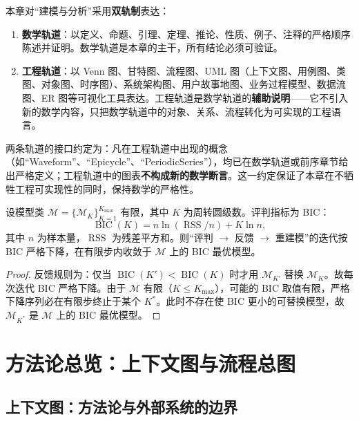 \begin{remark}[本章的建模双轨制]\label{rem:modelling_dual_track}
本章对“建模与分析”采用\textbf{双轨制}表达：
\begin{enumerate}[label=(\roman*)]
    \item \textbf{数学轨道}：以定义、命题、引理、定理、推论、性质、例子、注释的严格顺序陈述并证明。数学轨道是本章的主干，所有结论必须可验证。
    \item \textbf{工程轨道}：以 Venn 图、甘特图、流程图、UML 图（上下文图、用例图、类图、对象图、时序图）、系统架构图、用户故事地图、业务过程模型、数据流图、ER 图等可视化工具表达。工程轨道是数学轨道的\textbf{辅助说明}——它不引入新的数学内容，只把数学轨道中的对象、关系、流程转化为可实现的工程语言。
\end{enumerate}
两条轨道的接口约定为：凡在工程轨道中出现的概念（如“Waveform”、“Epicycle”、“PeriodicSeries”），均已在数学轨道或前序章节给出严格定义；工程轨道中的图表\textbf{不构成新的数学断言}。这一约定保证了本章在不牺牲工程可实现性的同时，保持数学的严格性。
\end{remark}

\begin{lemma}[方法论流程的反馈闭合]\label{ch34_pipeline_closure}
设模型类 $\mathcal{M} = \{\mathcal{M}_K\}_{K=1}^{K_{\max}}$ 有限，其中 $K$ 为周转圆级数。评判指标为 BIC：
\[
\operatorname{BIC}(K) = n\ln(\operatorname{RSS}/n) + K\ln n,
\]
其中 $n$ 为样本量，$\operatorname{RSS}$ 为残差平方和。则“评判 $\to$ 反馈 $\to$ 重建模”的迭代按 BIC 严格下降，在有限步内收敛于 $\mathcal{M}$ 上的 BIC 最优模型。
\end{lemma}

\begin{proof}
反馈规则为：仅当 $\operatorname{BIC}(K') < \operatorname{BIC}(K)$ 时才用 $\mathcal{M}_{K'}$ 替换 $\mathcal{M}_K$。故每次迭代 BIC 严格下降。由于 $\mathcal{M}$ 有限（$K \le K_{\max}$），可能的 BIC 取值有限，严格下降序列必在有限步终止于某个 $K^*$。此时不存在使 BIC 更小的可替换模型，故 $\mathcal{M}_{K^*}$ 是 $\mathcal{M}$ 上的 BIC 最优模型。
\end{proof}

\section{方法论总览：上下文图与流程总图}

\subsection{上下文图：方法论与外部系统的边界}

